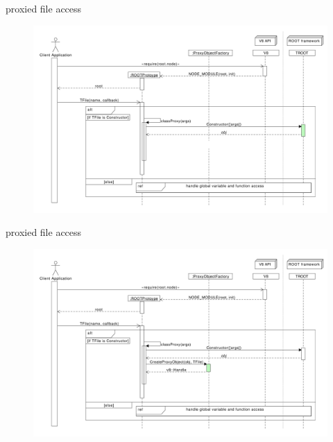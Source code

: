 \begin{frame}{proxied file access}
  \begin{figure}[htb]
    \centering
      \includegraphics[width=\textwidth, height=.85\textheight, keepaspectratio]{./resources/proxycall/fileOpen_h4.pdf}
  \end{figure}
\end{frame}

\begin{frame}{proxied file access}
  \begin{figure}[htb]
    \centering
      \includegraphics[width=\textwidth, height=.85\textheight, keepaspectratio]{./resources/proxycall/fileOpen_h5.pdf}
  \end{figure}
\end{frame}


